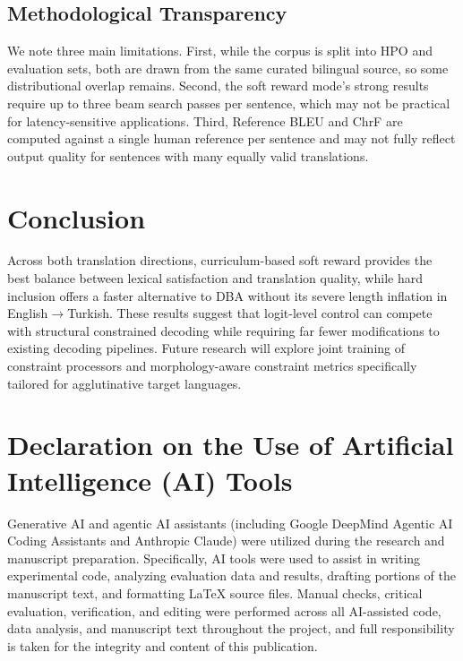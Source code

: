 \documentclass{tlp}
\begin{document}
\subsection{Methodological Transparency}

We note three main limitations. First, while the corpus is split into HPO and
evaluation sets, both are drawn from the same curated bilingual source, so some
distributional overlap remains. Second, the soft reward mode's strong results require
up to three beam search passes per sentence, which may not be practical for
latency-sensitive applications. Third, Reference BLEU and ChrF are computed against a
single human reference per sentence and may not fully reflect output quality for
sentences with many equally valid translations.


\section{Conclusion}

Across both translation directions, curriculum-based soft reward provides the best
balance between lexical satisfaction and translation quality, while hard inclusion
offers a faster alternative to DBA without its severe length inflation in
English$\rightarrow$Turkish. These results suggest that logit-level control can
compete with structural constrained decoding while requiring far fewer modifications
to existing decoding pipelines. Future research will explore joint training of
constraint processors and morphology-aware constraint metrics specifically tailored
for agglutinative target languages.



\section*{Declaration on the Use of Artificial Intelligence (AI) Tools}

Generative AI and agentic AI assistants (including Google DeepMind Agentic AI Coding Assistants and Anthropic Claude) were utilized during the research and manuscript preparation. Specifically, AI tools were used to assist in writing experimental code, analyzing evaluation data and results, drafting portions of the manuscript text, and formatting LaTeX source files. Manual checks, critical evaluation, verification, and editing were performed across all AI-assisted code, data analysis, and manuscript text throughout the project, and full responsibility is taken for the integrity and content of this publication.
\end{document}
